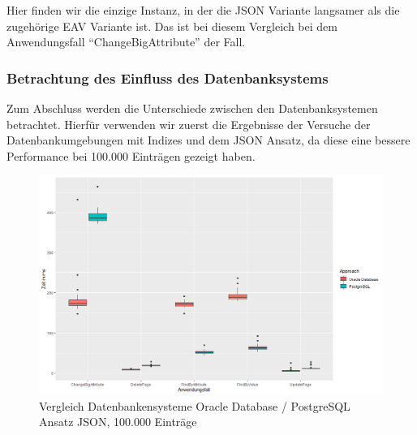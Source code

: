 Hier finden wir die einzige Instanz, in der die JSON Variante langsamer als die zugehörige EAV Variante ist. Das ist bei diesem Vergleich bei dem Anwendungsfall ``ChangeBigAttribute'' der Fall.


\begin{table}[h]
\caption{P-Werte des Mann-Whitney-U-Tests mit Alternativhypothese ``two.sided''; Vergleich der Ansätze EAV und JSON, jeweils mit Index}
\centering
{}
\label{tab:mwApproach}
\end{table}

\subsubsection*{Betrachtung des Einfluss des Datenbanksystems}

Zum Abschluss werden die Unterschiede zwischen den Datenbanksystemen betrachtet. Hierfür verwenden wir zuerst die Ergebnisse der Versuche der Datenbankumgebungen mit Indizes und dem JSON Ansatz, da diese eine bessere Performance bei 100.000 Einträgen gezeigt haben.

\begin{figure}[H]
\centering
\includegraphics[scale=0.5]{rStudioPictures/postgresoracle.png}
\caption{Vergleich Datenbankensysteme Oracle Database / PostgreSQL \\ Ansatz JSON, 100.000 Einträge}
\label{fig:DatabasesJSON}
\end{figure}


